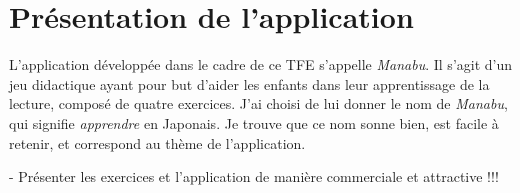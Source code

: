 \section{Présentation de l'application}
L'application développée dans le cadre de ce TFE s'appelle \textit{Manabu}. Il s'agit d'un jeu didactique ayant pour but d'aider les enfants dans leur apprentissage de la lecture, composé de quatre exercices. J'ai choisi de lui donner le nom de \textit{Manabu}, qui signifie \textit{apprendre} en Japonais. Je trouve que ce nom sonne bien, est facile à retenir, et correspond au thème de l'application.

- Présenter les exercices et l'application de manière commerciale et attractive !!!